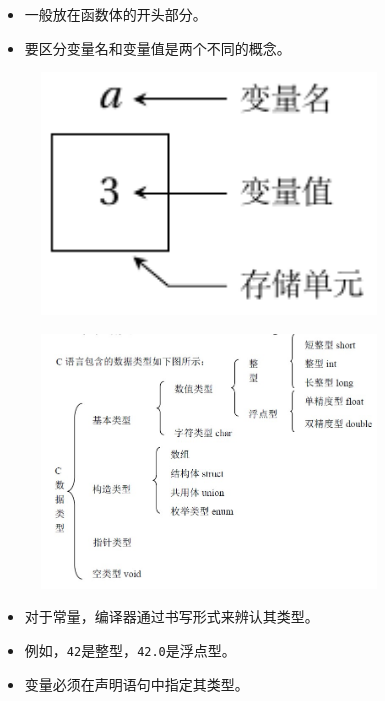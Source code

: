 \begin{frame}
\begin{itemize}
\item
一般放在函数体的开头部分。\\[0.1in]
\item
要区分变量名和变量值是两个不同的概念。
\end{itemize}

\begin{figure}
\centering
\includegraphics[width=3.5in]{ch03/images/var}
\end{figure}

\end{frame}


\begin{frame}
\begin{figure}
\includegraphics[width=3.5in]{ch03/images/datatype}
\end{figure}
\end{frame}


\begin{frame}
\begin{itemize}
\item 
对于常量，编译器通过书写形式来辨认其类型。\\[0.1in]
\item[] 例如，\lstinline|42|是整型，\lstinline|42.0|是浮点型。\\[0.2in]
\item
变量必须在声明语句中指定其类型。
\end{itemize}
\end{frame}

